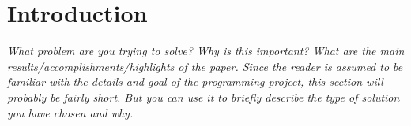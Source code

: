 \section{Introduction}
\label{sec:introduction}

\emph{What problem are you trying to solve? Why is this important? What are the main results/accomplishments/highlights of the paper. Since the reader is assumed to be familiar with the details and goal of the programming project, this section will probably be fairly short. But you can use it to briefly describe the type of solution you have chosen and why.}

